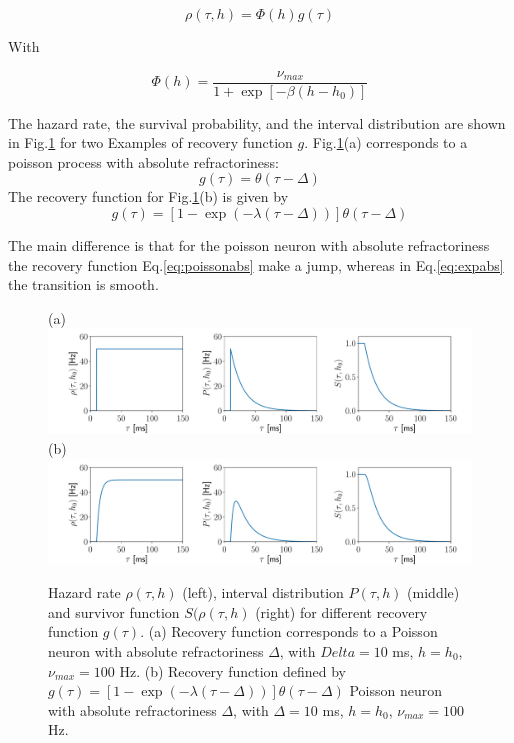 \documentclass[a4paper,11pt,twoside]{article}
\numberwithin{equation}{section}
\begin{document}
\begin{equation}
\label{eq:rho}
\rho(\tau,h)=\Phi(h)g(\tau)
\end{equation}

With 

\begin{equation}
\label{eq:phi}
\Phi(h)=\frac{\nu_{max}}{1+\exp[-\beta(h-h_0)]}
\end{equation}

The hazard rate, the survival probability, and the interval distribution are shown in Fig.\ref{fig:renewalprocess} for two Examples of recovery function $g$. Fig.\ref{fig:renewalprocess}(a) corresponds to a poisson process with absolute refractoriness: 
\begin{equation}
\label{eq:poissonabs}
g(\tau)=\theta(\tau-\Delta)
\end{equation}
The recovery function for Fig.\ref{fig:renewalprocess}(b) is given by
\begin{equation}
\label{eq:expabs}
g(\tau)=\left[1-\exp(-\lambda(\tau-\Delta))\right]\theta(\tau-\Delta)
\end{equation}

The main difference is that for the poisson neuron with absolute refractoriness the recovery function Eq.\eqref{eq:poissonabs} make a jump, whereas in Eq.\eqref{eq:expabs} the transition is smooth.
\begin{figure}
	(a) \\
	\includegraphics[width=\linewidth]{poissonRHOSP.pdf}
	(b)\\
	\includegraphics[width=\linewidth]{expRHOSP.pdf}
	\caption{Hazard rate $\rho(\tau,h)$ (left), interval distribution $P(\tau,h)$ (middle) and survivor function $S(\rho(\tau,h)$ (right) for different recovery function $g(\tau)$. (a) Recovery function corresponds to a Poisson neuron with absolute refractoriness $\Delta$, with $Delta=10$ ms, $h=h_0$, $\nu_{max}=100$ Hz.  (b) Recovery function defined  by $ g(\tau)=\left[1-\exp(-\lambda(\tau-\Delta))\right]\theta(\tau-\Delta)$ Poisson neuron with absolute refractoriness $\Delta$, with $\Delta=10$ ms, $h=h_0$, $\nu_{max}=100$ Hz.  }
	\label{fig:renewalprocess}
\end{figure}
\end{document}
